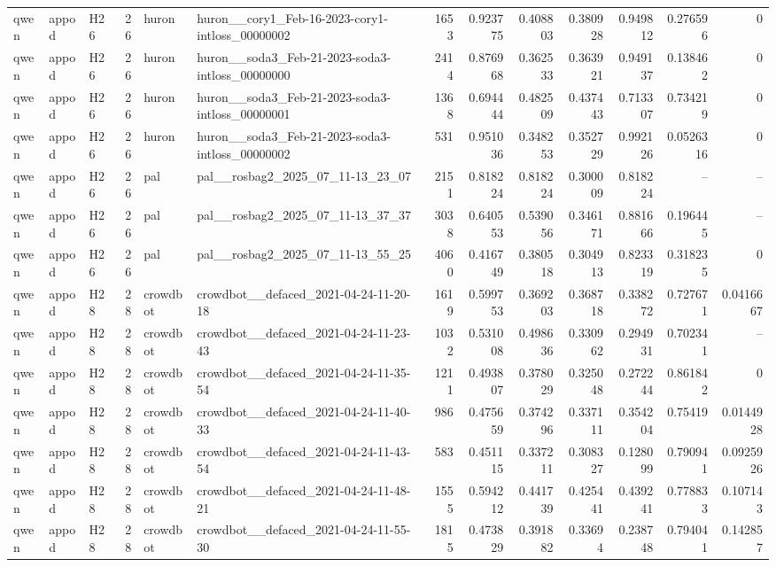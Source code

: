 \begin{longtable}{lllrllrrrrrrr}
qwen & appod & H26 & 26 & huron & huron\_\_cory1\_Feb-16-2023-cory1-intloss\_00000002 & 1653 & 0.923775 & 0.408803 & 0.380928 & 0.949812 & 0.276596 & 0 \\
qwen & appod & H26 & 26 & huron & huron\_\_soda3\_Feb-21-2023-soda3-intloss\_00000000 & 2414 & 0.876968 & 0.362533 & 0.363921 & 0.949137 & 0.138462 & 0 \\
qwen & appod & H26 & 26 & huron & huron\_\_soda3\_Feb-21-2023-soda3-intloss\_00000001 & 1368 & 0.694444 & 0.482509 & 0.437443 & 0.713307 & 0.734219 & 0 \\
qwen & appod & H26 & 26 & huron & huron\_\_soda3\_Feb-21-2023-soda3-intloss\_00000002 & 531 & 0.951036 & 0.348253 & 0.352729 & 0.992126 & 0.0526316 & 0 \\
qwen & appod & H26 & 26 & pal & pal\_\_rosbag2\_2025\_07\_11-13\_23\_07 & 2151 & 0.818224 & 0.818224 & 0.300009 & 0.818224 & -- & -- \\
qwen & appod & H26 & 26 & pal & pal\_\_rosbag2\_2025\_07\_11-13\_37\_37 & 3038 & 0.640553 & 0.539056 & 0.346171 & 0.881666 & 0.196445 & -- \\
qwen & appod & H26 & 26 & pal & pal\_\_rosbag2\_2025\_07\_11-13\_55\_25 & 4060 & 0.416749 & 0.380518 & 0.304913 & 0.823319 & 0.318235 & 0 \\
qwen & appod & H28 & 28 & crowdbot & crowdbot\_\_defaced\_2021-04-24-11-20-18 & 1619 & 0.599753 & 0.369203 & 0.368718 & 0.338272 & 0.727671 & 0.0416667 \\
qwen & appod & H28 & 28 & crowdbot & crowdbot\_\_defaced\_2021-04-24-11-23-43 & 1032 & 0.531008 & 0.498636 & 0.330962 & 0.294931 & 0.702341 & -- \\
qwen & appod & H28 & 28 & crowdbot & crowdbot\_\_defaced\_2021-04-24-11-35-54 & 1211 & 0.493807 & 0.378029 & 0.325048 & 0.272244 & 0.861842 & 0 \\
qwen & appod & H28 & 28 & crowdbot & crowdbot\_\_defaced\_2021-04-24-11-40-33 & 986 & 0.475659 & 0.374296 & 0.337111 & 0.354204 & 0.75419 & 0.0144928 \\
qwen & appod & H28 & 28 & crowdbot & crowdbot\_\_defaced\_2021-04-24-11-43-54 & 583 & 0.451115 & 0.337211 & 0.308327 & 0.128099 & 0.790941 & 0.0925926 \\
qwen & appod & H28 & 28 & crowdbot & crowdbot\_\_defaced\_2021-04-24-11-48-21 & 1555 & 0.594212 & 0.441739 & 0.425441 & 0.439241 & 0.778833 & 0.107143 \\
qwen & appod & H28 & 28 & crowdbot & crowdbot\_\_defaced\_2021-04-24-11-55-30 & 1815 & 0.473829 & 0.391882 & 0.33694 & 0.238748 & 0.794041 & 0.142857 \\

\end{longtable}
